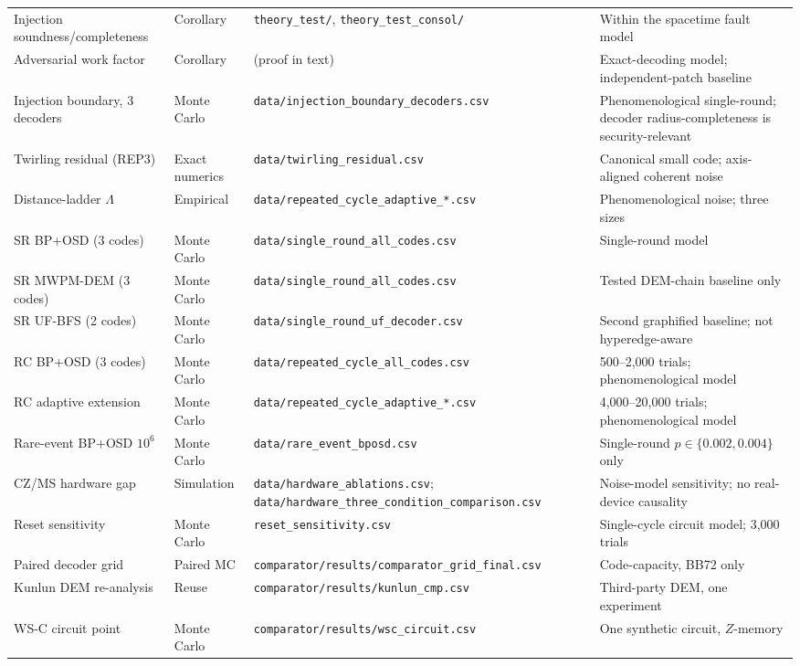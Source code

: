 \documentclass[11pt,a4paper]{article}
\begin{document}
\begin{table}[H]
\begin{tabularx}{\textwidth}{@{}p{3.1cm}p{1.7cm}X p{2.9cm}@{}}
Injection soundness/completeness & Corollary & \texttt{theory\_test/}, \texttt{theory\_test\_consol/} & Within the spacetime fault model \\
Adversarial work factor & Corollary & (proof in text) & Exact-decoding model; independent-patch baseline \\
Injection boundary, 3 decoders & Monte Carlo & \texttt{data/injection\_boundary\_decoders.csv} & Phenomenological single-round; decoder radius-completeness is security-relevant \\
Twirling residual (REP3) & Exact numerics & \texttt{data/twirling\_residual.csv} & Canonical small code; axis-aligned coherent noise \\
Distance-ladder $\Lambda$ & Empirical & \texttt{data/repeated\_cycle\_adaptive\_*.csv} & Phenomenological noise; three sizes \\
SR BP+OSD (3 codes) & Monte Carlo & \texttt{data/single\_round\_all\_codes.csv} & Single-round model \\
SR MWPM-DEM (3 codes) & Monte Carlo & \texttt{data/single\_round\_all\_codes.csv} & Tested DEM-chain baseline only \\
SR UF-BFS (2 codes) & Monte Carlo & \texttt{data/single\_round\_uf\_decoder.csv} & Second graphified baseline; not hyperedge-aware \\
RC BP+OSD (3 codes) & Monte Carlo & \texttt{data/repeated\_cycle\_all\_codes.csv} & 500--2,000 trials; phenomenological model \\
RC adaptive extension & Monte Carlo & \texttt{data/repeated\_cycle\_adaptive\_*.csv} & 4,000--20,000 trials; phenomenological model \\
Rare-event BP+OSD $10^{6}$ & Monte Carlo & \texttt{data/rare\_event\_bposd.csv} & Single-round $p\in\{0.002,0.004\}$ only \\
CZ/MS hardware gap & Simulation & \texttt{data/hardware\_ablations.csv}; \texttt{data/hardware\_three\_condition\_comparison.csv} & Noise-model sensitivity; no real-device causality \\
Reset sensitivity & Monte Carlo & \texttt{reset\_sensitivity.csv} & Single-cycle circuit model; 3,000 trials \\
Paired decoder grid & Paired MC & \texttt{comparator/results/comparator\_grid\_final.csv} & Code-capacity, BB72 only \\
Kunlun DEM re-analysis & Reuse & \texttt{comparator/results/kunlun\_cmp.csv} & Third-party DEM, one experiment \\
WS-C circuit point & Monte Carlo & \texttt{comparator/results/wsc\_circuit.csv} & One synthetic circuit, $Z$-memory \\

\end{tabularx}
\end{table}
\end{document}

